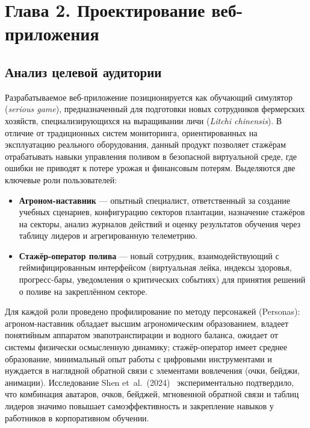 \section*{Глава 2. Проектирование веб-приложения}


\subsection{Анализ целевой аудитории}

Разрабатываемое веб-приложение позиционируется как обучающий
симулятор (\emph{serious game}), предназначенный для подготовки
новых сотрудников фермерских хозяйств, специализирующихся на
выращивании личи (\textit{Litchi chinensis}). В отличие от
традиционных систем мониторинга, ориентированных на эксплуатацию
реального оборудования, данный продукт позволяет стажёрам
отрабатывать навыки управления поливом в безопасной виртуальной
среде, где ошибки не приводят к потере урожая и финансовым
потерям. Выделяются две ключевые роли пользователей:

\begin{itemize}
	\item \textbf{Агроном-наставник} --- опытный специалист,
	ответственный за создание учебных сценариев, конфигурацию
	секторов плантации, назначение стажёров на секторы, анализ
	журналов действий и оценку результатов обучения через таблицу
	лидеров и агрегированную телеметрию.
	\item \textbf{Стажёр-оператор полива} --- новый сотрудник,
	взаимодействующий с геймифицированным интерфейсом
	(виртуальная лейка, индексы здоровья, прогресс-бары,
	уведомления о критических событиях) для принятия решений
	о поливе на закреплённом секторе.
\end{itemize}

Для каждой роли проведено профилирование по методу персонажей
(Personas): агроном-наставник обладает высшим агрономическим
образованием, владеет понятийным аппаратом эвапотранспирации
и водного баланса, ожидает от системы физически осмысленную
динамику; стажёр-оператор имеет среднее образование, минимальный
опыт работы с цифровыми инструментами и нуждается в наглядной
обратной связи с элементами вовлечения (очки, бейджи, анимации).
Исследование Shen et~al.~(2024)~\cite{shen2024_gamification_workforce}
экспериментально подтвердило, что комбинация аватаров, очков,
бейджей, мгновенной обратной связи и таблиц лидеров значимо
повышает самоэффективность и закрепление навыков у работников
в корпоративном обучении.



